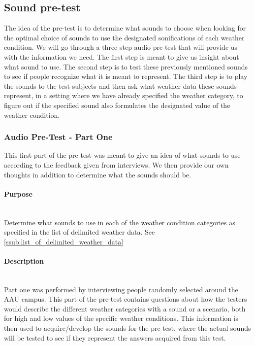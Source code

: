 
\FloatBarrier
\subsection{Sound pre-test} %
\label{sub:sound_pre_test}
The idea of the pre-test is to determine what sounds to choose when looking for the optimal choice of sounds to use the designated sonifications of each weather condition. 
We will go through a three step audio pre-test that will provide us with the information we need. 
The first step is meant to give us insight about what sound to use. 
The second step is to test these previously mentioned sounds to see if people recognize what it is meant to represent. 
The third step is to play the sounds to the test subjects and then ask what weather data these sounds represent, in a setting where we have already specified the weather category, to figure out if the specified sound also formulates the designated value of the weather condition.

\subsubsection{Audio Pre-Test - Part One} %
\label{ssub:audio_pre_test_part_one}
This first part of the pre-test was meant to give an idea of what sounds to use according to the feedback given from interviews. 
We then provide our own thoughts in addition to determine what the sounds should be.

\paragraph{Purpose} %
\label{par:purpose} 
\hspace{0pt} \\
Determine what sounds to use in each of the weather condition categories as specified in the list of delimited weather data. See \ref{ssub:list_of_delimited_weather_data}


\paragraph{Description} %
\label{par:description}
\hspace{0pt} \\
Part one was performed by interviewing people randomly selected around the AAU campus. 
This part of the pre-test contains questions about how the testers would describe the different weather categories with a sound or a scenario, both for high and low values of the specific weather conditions. 
This information is then used to acquire/develop the sounds for the pre test, where the actual sounds will be tested to see if they represent the answers acquired from this test.

